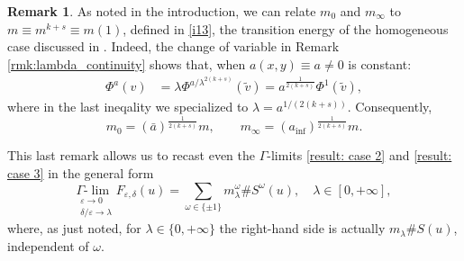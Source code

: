 \documentclass{article}
\theoremstyle{definition}
\newtheorem{Remark}[Theorem]{Remark}
\newcommand{\e}{\varepsilon}
\newcommand{\del}{\delta}
\def\e{\varepsilon}
\newcommand{\Glim}{\Gamma\textrm{-}\lim\;}
\begin{document}
\begin{Remark}
 As noted in the introduction, we can relate $m_0$ and $m_\infty$ to $m\equiv m^{k+s}\equiv m(1)$, defined in \eqref{i13}, the transition energy of the homogeneous case discussed in \cite{Solci_2024}. 
    Indeed, the change of variable in Remark \ref{rmk:lambda_continuity} shows that, when $a(x,y)\equiv a\neq 0$  is constant:
    \[
    \begin{split}
        \Phi^a(v) &= \lambda \Phi^{a/\lambda^{2(k+s)}}(\tilde v)= a^{\frac{1}{2(k+s)}}\Phi^1(\tilde v),
    \end{split}
    \]
    where in the last ineqality we specialized to $\lambda=a^{1/(2(k+s))}$. Consequently,
    \[
        m_0 = (\bar a)^\frac{1}{2(k+s)}m,\qquad
        m_\infty = (a_{\inf})^\frac{1}{2(k+s)}m.
    \]
\end{Remark}

  This last remark allows us to recast even the $\Gamma$-limits \eqref{result: case 2} and \eqref{result: case 3} in the general form
  \begin{equation*}
            \underset{\substack{\e\to 0 \\ \del/\e\to \lambda}}{\Glim}F_{\e,\del}(u)=\sum_{\omega\in\{\pm 1\}} m^\omega_\lambda \# S^\omega(u), \quad \lambda\in [0,+\infty],
\end{equation*}
where, as just noted, for $\lambda\in \{0,+\infty\}$ the right-hand side is actually $m_\lambda \# S(u)$, independent of $\omega$.
%
%
\end{document}
